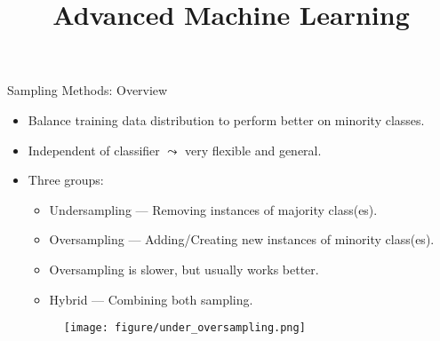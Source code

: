 \documentclass[11pt,compress,t,notes=noshow, xcolor=table]{beamer}
\title{Advanced Machine Learning}
\date{}
\begin{document}
	

\sloppy
	
\begin{frame}{Sampling Methods: Overview}
    \small{
		\begin{itemize}
			\item Balance training data distribution to perform better on minority classes.
			
			\item Independent of classifier $\leadsto$ very flexible and general.
   
			\item Three groups: 
		
			\begin{minipage}{0.59\textwidth}
				\begin{itemize} 
                    \small
                    
					\item Undersampling --- Removing instances of majority class(es).
			
					\item Oversampling --- Adding/Creating new instances of minority class(es).

                    \item Oversampling is slower, but usually works better.

					\item Hybrid --- Combining both sampling.
			
				\end{itemize}
			\end{minipage}
            \hfill
			\begin{minipage}{0.3\textwidth}
					\begin{figure}[c]
					\centering
                    \texttt{[image: figure/under\_oversampling.png]}
				\end{figure}
			\end{minipage}
		\end{itemize}
	}
\end{frame}
	
\end{document}
